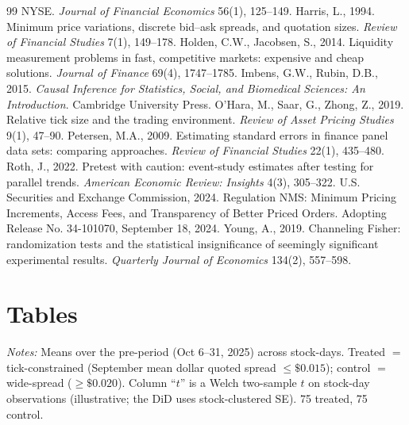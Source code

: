 \documentclass[12pt]{article}
\begin{document}
\begin{thebibliography}{99}
NYSE. \textit{Journal of Financial Economics} 56(1), 125--149.
 Harris, L., 1994. Minimum price variations, discrete
bid--ask spreads, and quotation sizes. \textit{Review of Financial Studies} 7(1), 149--178.
 Holden, C.W., Jacobsen, S., 2014. Liquidity
measurement problems in fast, competitive markets: expensive and cheap solutions.
\textit{Journal of Finance} 69(4), 1747--1785.
 Imbens, G.W., Rubin, D.B., 2015. \textit{Causal
Inference for Statistics, Social, and Biomedical Sciences: An Introduction}. Cambridge
University Press.
 O'Hara, M., Saar, G., Zhong, Z., 2019. Relative
tick size and the trading environment. \textit{Review of Asset Pricing Studies} 9(1),
47--90.
 Petersen, M.A., 2009. Estimating standard errors in
finance panel data sets: comparing approaches. \textit{Review of Financial Studies} 22(1),
435--480.
 Roth, J., 2022. Pretest with caution: event-study estimates after
testing for parallel trends. \textit{American Economic Review: Insights} 4(3), 305--322.
 U.S. Securities and Exchange Commission, 2024. Regulation NMS:
Minimum Pricing Increments, Access Fees, and Transparency of Better Priced Orders. Adopting
Release No. 34-101070, September 18, 2024.
 Young, A., 2019. Channeling Fisher: randomization tests and the
statistical insignificance of seemingly significant experimental results. \textit{Quarterly
Journal of Economics} 134(2), 557--598.
\end{thebibliography}

\clearpage
\appendix
\section*{Tables}

\begin{table}[htbp]\centering
\begin{threeparttable}
\caption{Pre-period covariate balance, treated vs.\ control}\label{tab:balance}
\small

\begin{tablenotes}\small
\item \textit{Notes:} Means over the pre-period (Oct 6--31, 2025) across stock-days.
Treated $=$ tick-constrained (September mean dollar quoted spread $\le\$0.015$); control $=$
wide-spread ($\ge\$0.020$). Column ``$t$'' is a Welch two-sample $t$ on stock-day
observations (illustrative; the DiD uses stock-clustered SE). 75 treated, 75 control.
\end{tablenotes}
\end{threeparttable}
\end{table}
\end{document}
